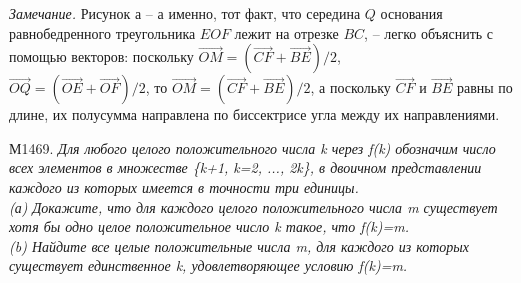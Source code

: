 \begin{multicols}{2}
\textit{Замечание.} Рисунок $а$ -- а именно, тот факт, что середина $Q$ основания равнобедренного треугольника  $EOF$ лежит на отрезке $BC$, -- легко объяснить с помощью векторов: поскольку $\overrightarrow{OM} = \left(\overrightarrow{CF} + \overrightarrow{BE}\right)\bigg/2$,\\
$\overrightarrow{OQ} = \left(\overrightarrow{OE} + \overrightarrow{OF}\right)\bigg/2$, то $\overrightarrow{OM} = \left(\overrightarrow{CF} + \overrightarrow{BE}\right)\bigg/2$, а поскольку $\overrightarrow{CF}$ и $\overrightarrow{BE}$ равны по длине, их полусумма направлена по биссектрисе угла между их направлениями.\\\par

М1469. \textit{Для любого целого положительного числа k через f(k) обозначим число всех элементов в множестве \{k+1, k=2, ..., 2k\}, в двоичном представлении каждого из которых имеется в точности три единицы.\\
(а) Докажите, что для каждого целого положительного числа m существует хотя бы одно целое положительное число k такое, что f(k)=m.\\
(b) Найдите все целые положительные числа m, для каждого из которых существует единственное k, удовлетворяющее условию f(k)=m.}\\\par


\end{multicols}
